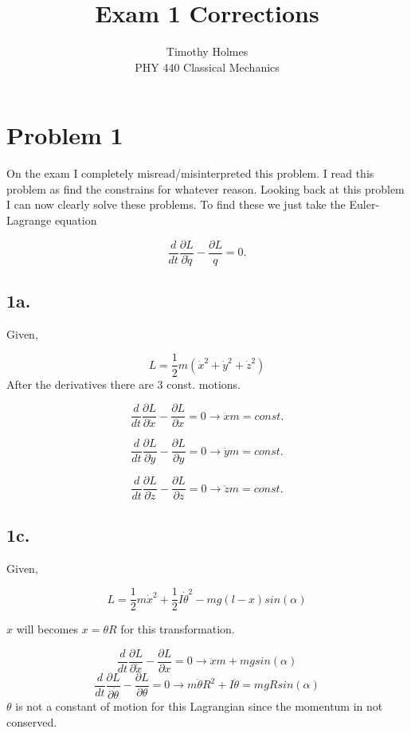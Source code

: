 \documentclass[12pt]{article}
\begin{document}
 
 
\title{Exam 1 Corrections}
\author{Timothy Holmes\\ %
PHY 440 Classical Mechanics}

\maketitle

\section*{Problem 1}
\noindent
On the exam I completely misread/misinterpreted this problem. I read this problem as find the constrains for whatever reason. Looking back at this problem I can now clearly solve these problems. To find these we just take the Euler-Lagrange equation

$$
\frac{d}{dt} \frac{\partial L}{\partial \dot{q}} - \frac{\partial L}{q} = 0.
$$

\subsection*{1a.}
\noindent
Given,

$$
L = \frac{1}{2}m(\dot{x}^{2} + \dot{y}^{2} + \dot{z}^{2})
$$
\noindent
After the derivatives there are 3 const. motions. 

$$
\frac{d}{dt} \frac{\partial L}{\partial \dot{x}} - \frac{\partial L}{\partial x} = 0 \rightarrow \ddot{x}m = const.
$$

$$
\frac{d}{dt} \frac{\partial L}{\partial \dot{y}} - \frac{\partial L}{\partial y} = 0 \rightarrow \ddot{y}m = const.
$$

$$
\frac{d}{dt} \frac{\partial L}{\partial \dot{z}} - \frac{\partial L}{\partial z} = 0 \rightarrow \ddot{z}m = const.
$$

\subsection*{1c.}
\noindent
Given,

$$
L = \frac{1}{2}m\dot{x}^{2} + \frac{1}{2}I\dot{\theta}^{2} - mg(l - x)sin(\alpha)
$$

$x$ will becomes $x = \theta R$ for this transformation. 

$$
\frac{d}{dt} \frac{\partial L}{\partial \dot{x}} - \frac{\partial L}{\partial x} = 0 \rightarrow \ddot{x}m + mgsin(\alpha)
$$
$$
\frac{d}{dt} \frac{\partial L}{\partial \dot{\theta}} - \frac{\partial L}{\partial \theta} = 0 \rightarrow m\ddot{\theta}R^{2} + I\ddot{\theta} = mgRsin(\alpha) 
$$
\noindent
$\theta$ is not a constant of motion for this Lagrangian since the momentum in not conserved. 
\end{document}
